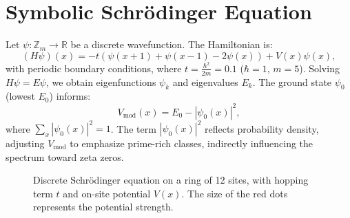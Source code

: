 \section{Symbolic Schr\"odinger Equation}
Let \( \psi: \mathbb{Z}_{m} \to \mathbb{R} \) be a discrete wavefunction. The Hamiltonian is:
\[
(H\psi)(x) = -t(\psi(x+1) + \psi(x-1) - 2\psi(x)) + V(x)\psi(x),
\]
with periodic boundary conditions, where \( t = \frac{\hbar^2}{2m} = 0.1 \) (\(\hbar = 1\), \(m = 5\)). Solving \( H\psi = E\psi \), we obtain eigenfunctions \( \psi_k \) and eigenvalues \( E_k \). The ground state \( \psi_0 \) (lowest \( E_0 \)) informs:
\[
V_{\text{mod}}(x) = E_0 - |\psi_0(x)|^2,
\]
where \( \sum_x |\psi_0(x)|^2 = 1 \). The term \( |\psi_0(x)|^2 \) reflects probability density, adjusting \( V_{\text{mod}} \) to emphasize prime-rich classes, indirectly influencing the spectrum toward zeta zeros.

\begin{figure}[t]
\centering
{}
\caption{Discrete Schrödinger equation on a ring of 12 sites, with hopping term $t$ and on-site potential $V(x)$. The size of the red dots represents the potential strength.}
\label{fig:schrodinger_ring}
\end{figure}

